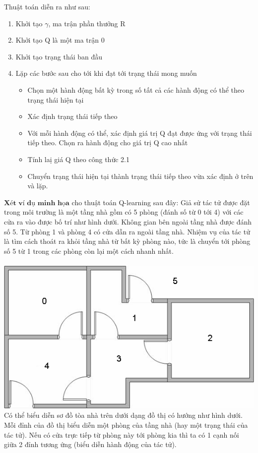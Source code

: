 \documentclass[14pt,a4paper,oneside]{report}		%
\begin{document}
	Thuật toán diễn ra như sau:
\begin{enumerate}
\item Khởi tạo $\gamma$, ma trận phần thưởng R
\item Khởi tạo Q là một ma trận 0
\item Khởi tạo trạng thái ban đầu
\item Lặp các bước sau cho tới khi đạt tới trạng thái mong muốn
\begin{itemize}
\item Chọn một hành động bất kỳ trong số tất cả các hành động có thể theo trạng thái hiện tại
\item Xác định trạng thái tiếp theo
\item Với mỗi hành động có thể, xác định giá trị Q đạt được ứng với trạng thái tiếp theo. Chọn ra hành động cho giá trị Q cao nhất
\item Tính laị giá Q theo công thức 2.1
\item Chuyển trạng thái hiện tại thành trạng thái tiếp theo vừa xác định ở trên và lặp.
\end{itemize}
\end{enumerate}
$\textbf{Xét ví dụ minh họa}$ cho thuật toán Q-learning sau đây: Giả sử tác tử được đặt trong môi trường là một tầng nhà gồm có 5 phòng (đánh số từ 0 tới 4) với các cửa ra vào được bố trí như hình dưới. Không gian bên ngoài tầng nhà được đánh số 5. Từ phòng 1 và phòng 4 có cửa dẫn ra ngoài tầng nhà. Nhiệm vụ của tác tử là tìm cách thoát ra khỏi tầng nhà từ bất kỳ phòng nào, tức là chuyển tới phòng số 5 từ 1 trong các phòng còn lại một cách nhanh nhất.\\
\\
\includegraphics[width=\textwidth,height=\textheight,keepaspectratio]{1.png}
Có thể biểu diễn sơ đồ tòa nhà trên dưới dạng đồ thị có hướng như hình dưới. Mỗi đỉnh của đồ thị biểu diễn một phòng của tầng nhà (hay một trạng thái của tác tử). Nếu có cửa trực tiếp từ phòng này tới phòng kia thì ta có 1 cạnh nối giữa 2 đỉnh tương ứng (biểu diễn hành động của tác tử).\\
\end{document}
